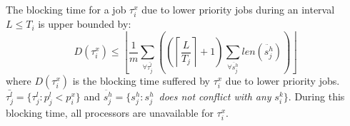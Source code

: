\begin{clm}\label{delay}
The blocking time for a job $\tau_{i}^{x}$ due to lower priority jobs 
during an interval $L\le T_{i}$ is upper bounded by:
\begin{equation}
D(\tau_{i}^{x})\le\left\lfloor \frac{1}{m}\sum_{\forall\bar{\tau_{j}^{l}}}\left(\left(\left\lceil \frac{L}{T_{j}}\right\rceil +1\right)\sum_{\forall\ddot{s_{j}^{h}}}len\left(\ddot{s_{j}^{h}}\right)\right)\right\rfloor \label{PNF-delay}
\end{equation}
where $D(\tau_{i}^{x})$ is the blocking time 
suffered by $\tau_{i}^{x}$
due to lower priority jobs. $\bar{\tau_{j}^{l}}=\{\tau_{j}^{l}:p_{j}^{l}<p_{i}^{x}\}$
and $\ddot{s_{j}^{h}}=\{s_{j}^{h}:s_{j}^{h}\,$ \textit{does not conflict with any} $s_{i}^{k}\}$.
During this blocking time, all processors are unavailable for $\tau_{i}^{x}$.
\end{clm}
